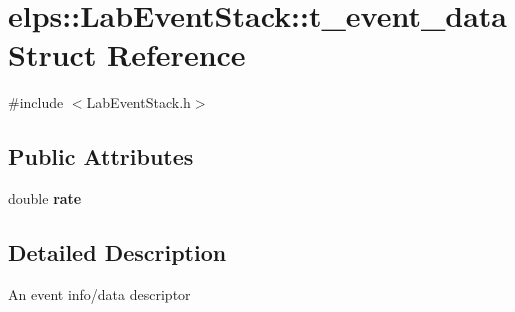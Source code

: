 \hypertarget{structelps_1_1_lab_event_stack_1_1t__event__data}{\section{elps\+:\+:Lab\+Event\+Stack\+:\+:t\+\_\+event\+\_\+data Struct Reference}
\label{structelps_1_1_lab_event_stack_1_1t__event__data}
}


{\ttfamily \#include $<$Lab\+Event\+Stack.\+h$>$}

\subsection*{Public Attributes}
\begin{DoxyCompactItemize}
\item 
\hypertarget{structelps_1_1_lab_event_stack_1_1t__event__data_a4febd5efe2a30a77627d1bd1e6aa8f9c}{double {\bfseries rate}}\label{structelps_1_1_lab_event_stack_1_1t__event__data_a4febd5efe2a30a77627d1bd1e6aa8f9c}

\end{DoxyCompactItemize}


\subsection{Detailed Description}
An event info/data descriptor 